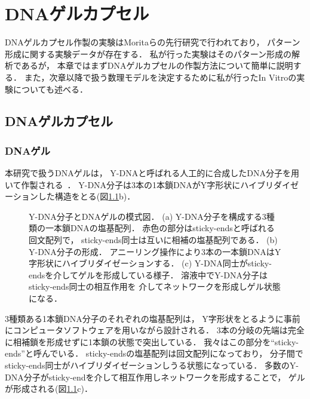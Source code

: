 \chapter{DNAゲルカプセル}
\label{sec:dnagel}

DNAゲルカプセル作製の実験はMoritaらの先行研究で行われており，
パターン形成に関する実験データが存在する\cite{moritasan}．
私が行った実験はそのパターン形成の解析であるが，
本章ではまずDNAゲルカプセルの作製方法について簡単に説明する．
また，次章以降で扱う数理モデルを決定するために私が行ったIn Vitroの実験についても述べる．

\section{DNAゲルカプセル}

\subsection{DNAゲル}
本研究で扱うDNAゲルは，
Y-DNAと呼ばれる人工的に合成したDNA分子を用いて作製される~\cite{morita2017formation}．
Y-DNA分子は3本の1本鎖DNAがY字形状にハイブリダイゼーションした構造をとる(図\ref{fig:ydna}b)．
\begin{figure}
    \centering
    
    \caption{Y-DNA分子とDNAゲルの模式図．
        (a) Y-DNA分子を構成する3種類の一本鎖DNAの塩基配列．
            赤色の部分はsticky-endsと呼ばれる回文配列で，
            sticky-ends同士は互いに相補の塩基配列である．
        (b) Y-DNA分子の形成．
            アニーリング操作により3本の一本鎖DNAはY字形状にハイブリダイゼーションする．
        (c) Y-DNA同士がsticky-endsを介してゲルを形成している様子．
            溶液中でY-DNA分子はsticky-ends同士の相互作用を
            介してネットワークを形成しゲル状態になる．
    }
    \label{fig:ydna}
\end{figure}
3種類ある1本鎖DNA分子のそれぞれの塩基配列は，
Y字形状をとるように事前にコンピュータソフトウェア\cite{zadeh2011nupack}を用いながら設計される．
3本の分岐の先端は完全に相補鎖を形成せずに1本鎖の状態で突出している．
我々はこの部分を``sticky-ends''と呼んでいる．
sticky-endsの塩基配列は回文配列になっており，
分子間でsticky-ends同士がハイブリダイゼーションしうる状態になっている．
多数のY-DNA分子がsticky-endを介して相互作用しネットワークを形成することで，
ゲルが形成される(図\ref{fig:ydna}c)．

